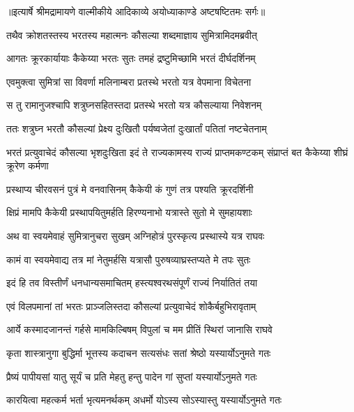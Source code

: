 {॥इत्यार्षे श्रीमद्रामायणे वाल्मीकीये आदिकाव्ये अयोध्याकाण्डे अष्टषष्टितमः सर्गः॥}


\twolineshloka
{तथैव क्रोशतस्तस्य भरतस्य महात्मनः}
{कौसल्या शब्दमाज्ञाय सुमित्रामिदमब्रवीत्} %

\twolineshloka
{आगतः क्रूरकार्यायाः कैकेय्या भरतः सुतः}
{तमहं द्रष्टुमिच्छामि भरतं दीर्घदर्शिनम्} %

\twolineshloka
{एवमुक्त्वा सुमित्रां सा विवर्णा मलिनाम्बरा}
{प्रतस्थे भरतो यत्र वेपमाना विचेतना} %

\twolineshloka
{स तु रामानुजश्चापि शत्रुघ्नसहितस्तदा}
{प्रतस्थे भरतो यत्र कौसल्याया निवेशनम्} %

\twolineshloka
{ततः शत्रुघ्न भरतौ कौसल्यां प्रेक्ष्य दुःखितौ}
{पर्यष्वजेतां दुःखार्तां पतितां नष्टचेतनाम्} %

\threelineshloka
{भरतं प्रत्युवाचेदं कौसल्या भृशदुःखिता}
{इदं ते राज्यकामस्य राज्यं प्राप्तमकण्टकम्}
{संप्राप्तं बत कैकेय्या शीघ्रं क्रूरेण कर्मणा} %

\twolineshloka
{प्रस्थाप्य चीरवसनं पुत्रं मे वनवासिनम्}
{कैकेयी कं गुणं तत्र पश्यति क्रूरदर्शिनी} %

\twolineshloka
{क्षिप्रं मामपि कैकेयी प्रस्थापयितुमर्हति}
{हिरण्यनाभो यत्रास्ते सुतो मे सुमहायशाः} %

\twolineshloka
{अथ वा स्वयमेवाहं सुमित्रानुचरा सुखम्}
{अग्निहोत्रं पुरस्कृत्य प्रस्थास्ये यत्र राघवः} %

\twolineshloka
{कामं वा स्वयमेवाद्य तत्र मां नेतुमर्हसि}
{यत्रासौ पुरुषव्याघ्रस्तप्यते मे तपः सुतः} %

\twolineshloka
{इदं हि तव विस्तीर्णं धनधान्यसमाचितम्}
{हस्त्यश्वरथसंपूर्णं राज्यं निर्यातितं तया} %

\twolineshloka
{एवं विलपमानां तां भरतः प्राञ्जलिस्तदा}
{कौसल्यां प्रत्युवाचेदं शोकैर्बहुभिरावृताम्} %

\twolineshloka
{आर्ये कस्मादजानन्तं गर्हसे मामकिल्बिषम्}
{विपुलां च मम प्रीतिं स्थिरां जानासि राघवे} %

\twolineshloka
{कृता शास्त्रानुगा बुद्धिर्मा भूत्तस्य कदाचन}
{सत्यसंधः सतां श्रेष्ठो यस्यार्योऽनुमते गतः} %

\twolineshloka
{प्रैष्यं पापीयसां यातु सूर्यं च प्रति मेहतु}
{हन्तु पादेन गां सुप्तां यस्यार्योऽनुमते गतः} %

\twolineshloka
{कारयित्वा महत्कर्म भर्ता भृत्यमनर्थकम्}
{अधर्मो योऽस्य सोऽस्यास्तु यस्यार्योऽनुमते गतः} %

